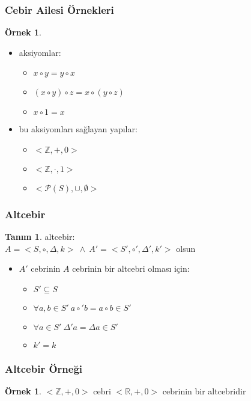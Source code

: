 \documentclass[dvipsnames]{beamer}
\theoremstyle{definition}
\newtheorem{tanim}[theorem]{Tanım}
\theoremstyle{example}
\newtheorem{ornek}[theorem]{Örnek}
\theoremstyle{plain}
\begin{document}
\begin{frame}
  \frametitle{Cebir Ailesi Örnekleri}

  \begin{ornek}
    \begin{itemize}
      \item aksiyomlar:
      \begin{itemize}
        \item $x \circ y = y \circ x$
        \item $(x \circ y) \circ z = x \circ (y \circ z)$
        \item $x \circ 1 = x$
      \end{itemize}

      \pause
      \item bu aksiyomları sağlayan yapılar:
      \begin{itemize}
       \item $<\mathbb{Z},+,0>$
       \item $<\mathbb{Z},\cdot,1>$
       \item $<\mathcal{P}(S),\cup,\emptyset>$
      \end{itemize}
    \end{itemize}
  \end{ornek}
\end{frame}

\begin{frame}
  \frametitle{Altcebir}

  \begin{tanim}
    \alert{altcebir}:\\
    $A = <S,\circ,\Delta,k>~\wedge~A' = <S',\circ',\Delta',k'>$ olsun

    \pause
    \medskip
    \begin{itemize}
      \item $A'$ cebrinin $A$ cebrinin bir altcebri olması için:
      \begin{itemize}
        \item $S' \subseteq S$
        \item $\forall a,b \in S'~a \circ' b = a \circ b \in S'$
        \item $\forall a \in S'~\Delta' a = \Delta a \in S'$
        \item $k' = k$
      \end{itemize}
    \end{itemize}
  \end{tanim}
\end{frame}

\begin{frame}
  \frametitle{Altcebir Örneği}

  \begin{ornek}
    $<\mathbb{Z},+,0>$ cebri
    $<\mathbb{R},+,0>$ cebrinin bir altcebridir
  \end{ornek}
\end{frame}
\end{document}
